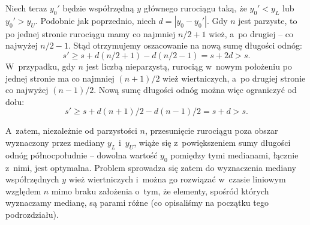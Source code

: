 Niech teraz $y_0'$ będzie współrzędną $y$ głównego rurociągu taką, że $y_0'<y_L$ lub $y_0'>y_U$.
Podobnie jak poprzednio, niech $d=|y_0-y_0'|$.
Gdy $n$ jest parzyste, to po jednej stronie rurociągu mamy co najmniej $n/2+1$ wież, a~po drugiej -- co najwyżej $n/2-1$.
Stąd otrzymujemy oszacowanie na nową sumę długości odnóg:
\[
    s' \ge s+d(n/2+1)-d(n/2-1) = s+2d > s.
\]
W~przypadku, gdy $n$ jest liczbą nieparzystą, rurociąg w~nowym położeniu po jednej stronie ma co najmniej $(n+1)/2$ wież wiertniczych, a~po drugiej stronie co najwyżej $(n-1)/2$.
Nową sumę długości odnóg można więc ograniczyć od dołu:
\[
    s' \ge s+d(n+1)/2-d(n-1)/2 = s+d > s.
\]

A~zatem, niezależnie od parzystości $n$, przesunięcie rurociągu poza obszar wyznaczony przez mediany $y_L$ i~$y_U$, wiąże się z~powiększeniem sumy długości odnóg północ\nbhyphen południe -- dowolna wartość $y_0$ pomiędzy tymi medianami, łącznie z~nimi, jest optymalna.
Problem sprowadza się zatem do wyznaczenia mediany współrzędnych $y$ wież wiertniczych i~można go rozwiązać w~czasie liniowym względem $n$ mimo braku założenia o~tym, że elementy, spośród których wyznaczamy medianę, są parami różne (co opisaliśmy na początku tego podrozdziału).
